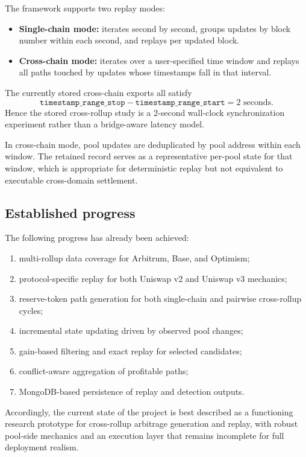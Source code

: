 \documentclass[11pt]{article}
\begin{document}
The framework supports two replay modes:
\begin{itemize}[leftmargin=1.5em]
    \item \textbf{Single-chain mode:} iterates second by second, groups updates by block number within each second, and replays per updated block.
    \item \textbf{Cross-chain mode:} iterates over a user-specified time window and replays all paths touched by updates whose timestamps fall in that interval.
\end{itemize}

The currently stored cross-chain exports all satisfy
\[
\texttt{timestamp\_range\_stop}-\texttt{timestamp\_range\_start}=2\text{ seconds}.
\]
Hence the stored cross-rollup study is a 2-second wall-clock synchronization experiment rather than a bridge-aware latency model.

In cross-chain mode, pool updates are deduplicated by pool address within each window. The retained record serves as a representative per-pool state for that window, which is appropriate for deterministic replay but not equivalent to executable cross-domain settlement.

\subsection{Established progress}

The following progress has already been achieved:
\begin{enumerate}[label=\arabic*.]
    \item multi-rollup data coverage for Arbitrum, Base, and Optimism;
    \item protocol-specific replay for both Uniswap v2 and Uniswap v3 mechanics;
    \item reserve-token path generation for both single-chain and pairwise cross-rollup cycles;
    \item incremental state updating driven by observed pool changes;
    \item gain-based filtering and exact replay for selected candidates;
    \item conflict-aware aggregation of profitable paths;
    \item MongoDB-based persistence of replay and detection outputs.
\end{enumerate}

Accordingly, the current state of the project is best described as a functioning research prototype for cross-rollup arbitrage generation and replay, with robust pool-side mechanics and an execution layer that remains incomplete for full deployment realism.
\end{document}
